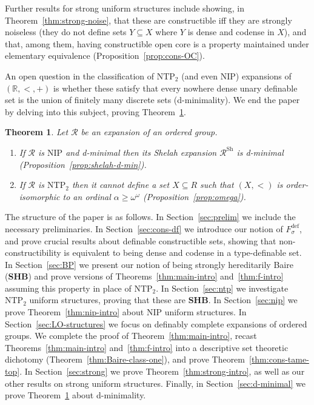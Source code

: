 \documentclass[12pt]{article}
\newcommand{\Rr}{\mathcal{R}}
\newcommand{\dF}{\ensuremath{F_\sigma^{\text{def}}}}
\newcommand{\BP}{\textbf{SHB}}
\newcommand{\R}{\mathbb{R}}
\newcommand{\Rshe}{\Rr^{\text{Sh}}}
\newcommand{\NIP}{\ensuremath{\mathrm{NIP}}}
\newcommand{\NTP}{\ensuremath{\mathrm{NTP}_2}}
\newtheorem{thmA}{Theorem}
\theoremstyle{definition}
\theoremstyle{remark}
\begin{document}
Further results for strong uniform structures include showing, in Theorem~\ref{thm:strong-noise}, that these are constructible iff they are strongly noiseless (they do not define sets $Y\subseteq X$ where $Y$ is dense and codense in $X$), and that, among them, having constructible open core is a property maintained under elementary equivalence (Proposition~\ref{prop:cons-OC}). 

An open question in the classification of $\NTP$ (and even $\NIP$) expansions of $(\R,<,+)$ is whether these satisfy that every nowhere dense unary definable set is the union of finitely many discrete sets (d-minimality). We end the paper by delving into this subject, proving Theorem~\ref{thm:d-minimal-intro}.

\begin{thmA}\label{thm:d-minimal-intro}
Let $\Rr$ be an expansion of an ordered group. 
\begin{enumerate}
\item If $\Rr$ is $\NIP$ and d-minimal then its Shelah expansion $\Rshe$ is d-minimal (Proposition~\ref{prop:shelah-d-min}). 
\item If $\Rr$ is $\NTP$ then it cannot define a set $X\subseteq R$ such that $(X,<)$ is order-isomorphic to an ordinal $\alpha\geq \omega^\omega$ (Proposition~\ref{prop:omega}). 
\end{enumerate}
\end{thmA}

The structure of the paper is as follows. In Section~\ref{sec:prelim} we include the necessary preliminaries. In Section~\ref{sec:cons-df} we introduce our notion of $\dF$, and prove crucial results about definable constructible sets, showing that non-constructibility is equivalent to being dense and codense in a type-definable set. In Section~\ref{sec:BP} we present our notion of being strongly hereditarily Baire (\BP) and prove versions of Theorems~\ref{thm:main-intro} and~\ref{thm:f-intro} assuming this property in place of $\NTP$. In Section~\ref{sec:ntp} we investigate $\NTP$ uniform structures, proving that these are $\BP$. In Section~\ref{sec:nip} we prove Theorem~\ref{thm:nip-intro} about $\NIP$ uniform structures. In Section~\ref{sec:LO-structures} we focus on definably complete expansions of ordered groups. We complete the proof of Theorem~\ref{thm:main-intro}, recast Theorems~\ref{thm:main-intro} and~\ref{thm:f-intro} into a descriptive set theoretic dichotomy (Theorem~\ref{thm:Baire-class-one}), and prove Theorem~\ref{thm:cons-tame-top}. In Section~\ref{sec:strong} we prove Theorem~\ref{thm:strong-intro}, as well as our other results on strong uniform structures. Finally, in Section~\ref{sec:d-minimal} we prove Theorem~\ref{thm:d-minimal-intro} about d-minimality. 
\end{document}
